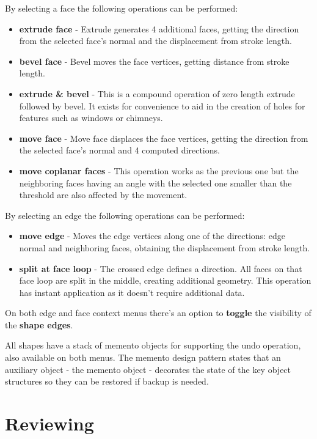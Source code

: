 
By selecting a face the following operations can be performed:
\begin{itemize}
	\item \textbf{extrude face} - Extrude generates 4 additional faces, getting the direction from the selected face's normal and the displacement from stroke length.
	\item	\textbf{bevel face} - Bevel moves the face vertices, getting distance from stroke length.
	\item	\textbf{extrude \& bevel} - This is a compound operation of zero length extrude followed by bevel. It exists for convenience to aid in the creation of holes for features such as windows or chimneys.
	\item	\textbf{move face} - Move face displaces the face vertices, getting the direction from the selected face's normal and 4 computed directions.
	\item	\textbf{move coplanar faces} - This operation works as the previous one but the neighboring faces having an angle with the selected one smaller than the threshold are also affected by the movement. 
\end{itemize}

By selecting an edge the following operations can be performed:
\begin{itemize}
	\item \textbf{move edge} - Moves the edge vertices along one of the directions: edge normal and neighboring faces, obtaining the displacement from stroke length.
	\item	\textbf{split at face loop} - The crossed edge defines a direction. All faces on that face loop are split in the middle, creating additional geometry. This operation has instant application as it doesn't require additional data.
\end{itemize}

On both edge and face context menus there's an option to \textbf{toggle} the visibility of the \textbf{shape edges}.

All shapes have a stack of memento objects for supporting the undo operation, also available on both menus.
The memento design pattern states that an auxiliary object - the memento object - decorates the state of the key object structures so they
can be restored if backup is needed.


\section{Reviewing}

